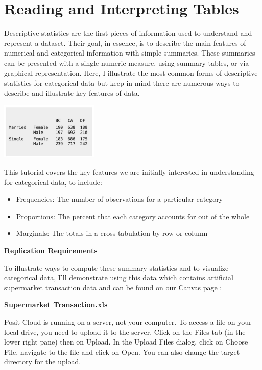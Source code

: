 \documentclass[
  letterpaper,
  DIV=11,
  numbers=noendperiod]{scrreprt}
\providecommand{\tightlist}{%
  \setlength{\itemsep}{0pt}\setlength{\parskip}{0pt}}\usepackage{longtable,booktabs,array}
\begin{document}
\chapter*{Reading and Interpreting
Tables}\label{reading-and-interpreting-tables}


Descriptive statistics are the first pieces of information used to
understand and represent a dataset. Their goal, in essence, is to
describe the main features of numerical and categorical information with
simple summaries. These summaries can be presented with a single numeric
measure, using summary tables, or via graphical representation. Here, I
illustrate the most common forms of descriptive statistics for
categorical data but keep in mind there are numerous ways to describe
and illustrate key features of data.

\includegraphics[width=0.35\textwidth,height=\textheight]{./images/Daily-6-Pic-1.jpg}

This tutorial covers the key features we are initially interested in
understanding for categorical data, to include:

\begin{itemize}
\tightlist
\item
  Frequencies: The number of observations for a particular category
\item
  Proportions: The percent that each category accounts for out of the
  whole
\item
  Marginals: The totals in a cross tabulation by row or column
\end{itemize}

\textbf{Replication Requirements}

To illustrate ways to compute these summary statistics and to visualize
categorical data, I'll demonstrate using this data which contains
artificial supermarket transaction data and can be found on our Canvas
page :

\textbf{Supermarket Transaction.xls}

Posit Cloud is running on a server, not your computer. To access a file
on your local drive, you need to upload it to the server. Click on the
Files tab (in the lower right pane) then on Upload. In the Upload Files
dialog, click on Choose File, navigate to the file and click on Open.
You can also change the target directory for the upload.
\end{document}
